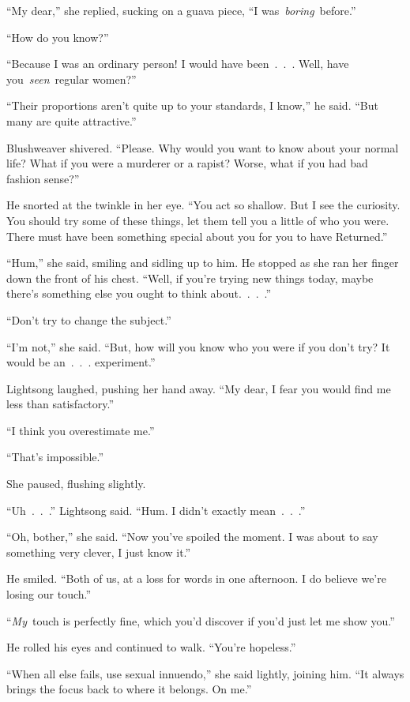 “My dear,” she replied, sucking on a guava piece, “I was~\textit{boring}~before.”

“How do you know?”

“Because I was an ordinary person! I would have been~.~.~. Well, have you~\textit{seen}~regular women?”

“Their proportions aren’t quite up to your standards, I know,” he said. “But many are quite attractive.”

Blushweaver shivered. “Please. Why would you want to know about your normal life? What if you were a murderer or a rapist? Worse, what if you had bad fashion sense?”

He snorted at the twinkle in her eye. “You act so shallow. But I see the curiosity. You should try some of these things, let them tell you a little of who you were. There must have been something special about you for you to have Returned.”

“Hum,” she said, smiling and sidling up to him. He stopped as she ran her finger down the front of his chest. “Well, if you’re trying new things today, maybe there’s something else you ought to think about.~.~.~.”

“Don’t try to change the subject.”

“I’m not,” she said. “But, how will you know who you were if you don’t try? It would be an~.~.~. experiment.”

Lightsong laughed, pushing her hand away. “My dear, I fear you would find me less than satisfactory.”

“I think you overestimate me.”

“That’s impossible.”

She paused, flushing slightly.

“Uh~.~.~.” Lightsong said. “Hum. I didn’t exactly mean~.~.~.”

“Oh, bother,” she said. “Now you’ve spoiled the moment. I was about to say something very clever, I just know it.”

He smiled. “Both of us, at a loss for words in one afternoon. I do believe we’re losing our touch.”

“\textit{My}~touch is perfectly fine, which you’d discover if you’d just let me show you.”

He rolled his eyes and continued to walk. “You’re hopeless.”

“When all else fails, use sexual innuendo,” she said lightly, joining him. “It always brings the focus back to where it belongs. On me.”

